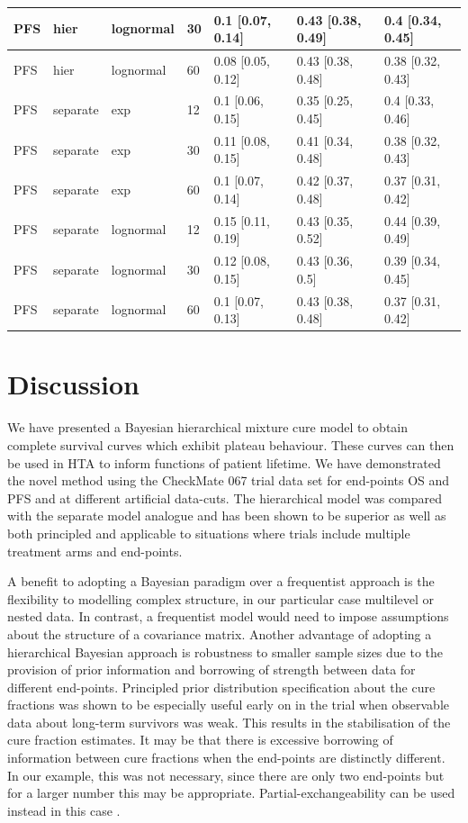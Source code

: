\documentclass[AMA,STIX1COL]{WileyNJD-v2}
\begin{document}
\begin{table}[!ht]
\begin{tabular}{l|l|l|l|l|l|l}
\hline
PFS & hier & lognormal & 30 & 0.1 [0.07, 0.14] & 0.43 [0.38, 0.49] & 0.4 [0.34, 0.45]\\
\hline
PFS & hier & lognormal & 60 & 0.08 [0.05, 0.12] & 0.43 [0.38, 0.48] & 0.38 [0.32, 0.43]\\
\hline
PFS & separate & exp & 12 & 0.1 [0.06, 0.15] & 0.35 [0.25, 0.45] & 0.4 [0.33, 0.46]\\
\hline
PFS & separate & exp & 30 & 0.11 [0.08, 0.15] & 0.41 [0.34, 0.48] & 0.38 [0.32, 0.43]\\
\hline
PFS & separate & exp & 60 & 0.1 [0.07, 0.14] & 0.42 [0.37, 0.48] & 0.37 [0.31, 0.42]\\
\hline
PFS & separate & lognormal & 12 & 0.15 [0.11, 0.19] & 0.43 [0.35, 0.52] & 0.44 [0.39, 0.49]\\
\hline
PFS & separate & lognormal & 30 & 0.12 [0.08, 0.15] & 0.43 [0.36, 0.5] & 0.39 [0.34, 0.45]\\
\hline
PFS & separate & lognormal & 60 & 0.1 [0.07, 0.13] & 0.43 [0.38, 0.48] & 0.37 [0.31, 0.42]\\
\hline
\end{tabular}
\end{table}

%
\section{Discussion}\label{sec:discussion}
We have presented a Bayesian hierarchical mixture cure model to obtain complete survival curves which exhibit plateau behaviour. These curves can then be used in HTA to inform functions of patient lifetime.
We have demonstrated the novel method using the CheckMate 067 trial data set for end-points OS and PFS and at different artificial data-cuts.
The hierarchical model was compared with the separate model analogue and has been shown to be superior as well as both principled and applicable to situations where trials include multiple treatment arms and end-points.

A benefit to adopting a Bayesian paradigm over a frequentist approach is the flexibility to modelling complex structure, in our particular case multilevel or nested data. In contrast, a frequentist model would need to impose assumptions about the structure of a covariance matrix.
Another advantage of adopting a hierarchical Bayesian approach is robustness to smaller sample sizes due to the provision of prior information and borrowing of strength between data for different end-points.
Principled prior distribution specification about the cure fractions was shown to be especially useful early on in the trial when observable data about long-term survivors was weak. 
This results in the stabilisation of the cure fraction estimates.
It may be that there is excessive borrowing of information between cure fractions when the end-points are distinctly different.
In our example, this was not necessary, since there are only two end-points but for a larger number this may be appropriate.
Partial-exchangeability can be used instead in this case \cite{Neuenschwander2016}.
\end{document}
